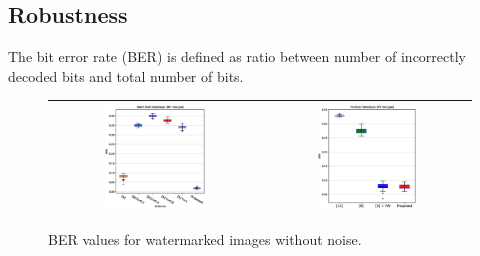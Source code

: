 \documentclass[runningheads]{llncs}
\begin{document}
\subsection{Robustness}
The bit error rate (BER) is defined as ratio between number of incorrectly decoded bits and total number of bits.
\begin{figure}[H]
	\begin{center}
		\begin{tabular}{|c|c|}\hline
			\includegraphics[width=0.5\textwidth]{BERWithoutSaintGall.eps}
			&\includegraphics[width=0.5\textwidth]{BERWithoutParzival.eps}\\\hline
		\end{tabular}
	\end{center}
	\caption{BER values for watermarked images without noise.}
	\label{berWithout}
\end{figure}
\end{document}
